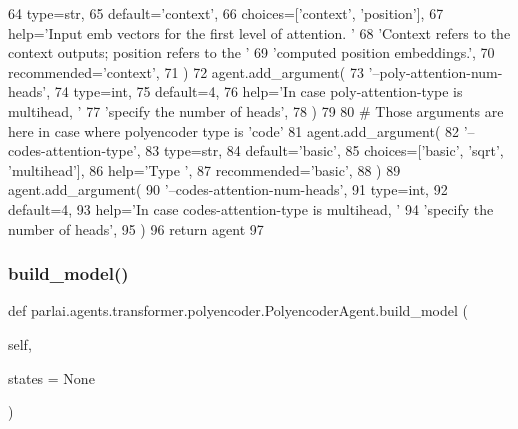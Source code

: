 \begin{DoxyCode}
64             type=str,
65             default=\textcolor{stringliteral}{'context'},
66             choices=[\textcolor{stringliteral}{'context'}, \textcolor{stringliteral}{'position'}],
67             help=\textcolor{stringliteral}{'Input emb vectors for the first level of attention. '}
68             \textcolor{stringliteral}{'Context refers to the context outputs; position refers to the '}
69             \textcolor{stringliteral}{'computed position embeddings.'},
70             recommended=\textcolor{stringliteral}{'context'},
71         )
72         agent.add\_argument(
73             \textcolor{stringliteral}{'--poly-attention-num-heads'},
74             type=int,
75             default=4,
76             help=\textcolor{stringliteral}{'In case poly-attention-type is multihead, '}
77             \textcolor{stringliteral}{'specify the number of heads'},
78         )
79 
80         \textcolor{comment}{# Those arguments are here in case where polyencoder type is 'code'}
81         agent.add\_argument(
82             \textcolor{stringliteral}{'--codes-attention-type'},
83             type=str,
84             default=\textcolor{stringliteral}{'basic'},
85             choices=[\textcolor{stringliteral}{'basic'}, \textcolor{stringliteral}{'sqrt'}, \textcolor{stringliteral}{'multihead'}],
86             help=\textcolor{stringliteral}{'Type '},
87             recommended=\textcolor{stringliteral}{'basic'},
88         )
89         agent.add\_argument(
90             \textcolor{stringliteral}{'--codes-attention-num-heads'},
91             type=int,
92             default=4,
93             help=\textcolor{stringliteral}{'In case codes-attention-type is multihead, '}
94             \textcolor{stringliteral}{'specify the number of heads'},
95         )
96         \textcolor{keywordflow}{return} agent
97 
\end{DoxyCode}
\mbox{\label{classparlai_1_1agents_1_1transformer_1_1polyencoder_1_1PolyencoderAgent_a50c59f1b745560d8883c1f9b65dce10a}} 
\subsubsection{\texorpdfstring{build\+\_\+model()}{build\_model()}}
{\footnotesize\ttfamily def parlai.\+agents.\+transformer.\+polyencoder.\+Polyencoder\+Agent.\+build\+\_\+model (\begin{DoxyParamCaption}\item[{}]{self,  }\item[{}]{states = {\ttfamily None} }\end{DoxyParamCaption})}

